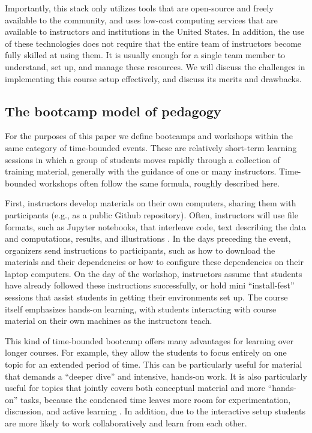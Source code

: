 Importantly, this stack only utilizes tools that are
open-source and freely available to
the community, and uses low-cost computing services that are available
to instructors and institutions in the United States. In addition, the
use of these technologies does not require that the entire
team of instructors become fully skilled at using them. It is
usually enough for a single team member to understand, set up, and manage these resources.
We will discuss the challenges in implementing this course
setup effectively, and discuss its merits and drawbacks.

\subsection{The bootcamp model of pedagogy}

For the purposes of this paper we define bootcamps and workshops within
the same category of time-bounded events. These are relatively short-term
learning sessions in which a group of students moves rapidly through a
collection of training material, generally with the guidance of one
or many instructors. Time-bounded workshops often follow the same
formula, roughly described here.

First, instructors develop materials on their own computers, sharing them with
participants (e.g., as a public Github repository). Often, instructors will use
file formats, such as Jupyter notebooks, that
interleave code, text describing the
data and computations, results, and illustrations
\cite{kluyver2016jupyter}. In the days preceding the event, organizers send
instructions to participants, such as how to download the materials and their
dependencies or how to configure these dependencies on their
laptop computers. On the day of the workshop, instructors assume that
students have already followed these instructions successfully, or hold
mini ``install-fest'' sessions that assist students in
getting their environments set up. The course itself emphasizes hands-on
learning, with students interacting with course material on their own
machines as the instructors teach.

This kind of time-bounded bootcamp offers many advantages for learning over
longer courses. For example, they allow the students to focus
entirely on one topic for an extended period of time. This can be particularly
useful for material that demands a ``deeper dive'' and intensive, hands-on
work. It is also particularly useful for topics that jointly
covers both conceptual material and more ``hands-on'' tasks, because the
condensed time leaves more room for experimentation, discussion, and active
learning \citep{Bransford2000-lu, Papert1980-fh}. In addition, due to the
interactive setup students are more likely to work collaboratively and learn
from each other.

